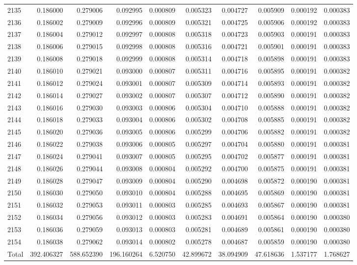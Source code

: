 \begin{tabular}{lrrrrrrrrr}
2135 & 0.186000 & 0.279006 & 0.092995 & 0.000809 & 0.005323 & 0.004727 & 0.005909 & 0.000192 & 0.000383 \\
2136 & 0.186002 & 0.279009 & 0.092996 & 0.000809 & 0.005321 & 0.004725 & 0.005906 & 0.000192 & 0.000383 \\
2137 & 0.186004 & 0.279012 & 0.092997 & 0.000808 & 0.005318 & 0.004723 & 0.005903 & 0.000191 & 0.000383 \\
2138 & 0.186006 & 0.279015 & 0.092998 & 0.000808 & 0.005316 & 0.004721 & 0.005901 & 0.000191 & 0.000383 \\
2139 & 0.186008 & 0.279018 & 0.092999 & 0.000808 & 0.005314 & 0.004718 & 0.005898 & 0.000191 & 0.000383 \\
2140 & 0.186010 & 0.279021 & 0.093000 & 0.000807 & 0.005311 & 0.004716 & 0.005895 & 0.000191 & 0.000382 \\
2141 & 0.186012 & 0.279024 & 0.093001 & 0.000807 & 0.005309 & 0.004714 & 0.005893 & 0.000191 & 0.000382 \\
2142 & 0.186014 & 0.279027 & 0.093002 & 0.000807 & 0.005307 & 0.004712 & 0.005890 & 0.000191 & 0.000382 \\
2143 & 0.186016 & 0.279030 & 0.093003 & 0.000806 & 0.005304 & 0.004710 & 0.005888 & 0.000191 & 0.000382 \\
2144 & 0.186018 & 0.279033 & 0.093004 & 0.000806 & 0.005302 & 0.004708 & 0.005885 & 0.000191 & 0.000382 \\
2145 & 0.186020 & 0.279036 & 0.093005 & 0.000806 & 0.005299 & 0.004706 & 0.005882 & 0.000191 & 0.000382 \\
2146 & 0.186022 & 0.279038 & 0.093006 & 0.000805 & 0.005297 & 0.004704 & 0.005880 & 0.000191 & 0.000381 \\
2147 & 0.186024 & 0.279041 & 0.093007 & 0.000805 & 0.005295 & 0.004702 & 0.005877 & 0.000191 & 0.000381 \\
2148 & 0.186026 & 0.279044 & 0.093008 & 0.000804 & 0.005292 & 0.004700 & 0.005875 & 0.000191 & 0.000381 \\
2149 & 0.186028 & 0.279047 & 0.093009 & 0.000804 & 0.005290 & 0.004698 & 0.005872 & 0.000190 & 0.000381 \\
2150 & 0.186030 & 0.279050 & 0.093010 & 0.000804 & 0.005288 & 0.004695 & 0.005869 & 0.000190 & 0.000381 \\
2151 & 0.186032 & 0.279053 & 0.093011 & 0.000803 & 0.005285 & 0.004693 & 0.005867 & 0.000190 & 0.000381 \\
2152 & 0.186034 & 0.279056 & 0.093012 & 0.000803 & 0.005283 & 0.004691 & 0.005864 & 0.000190 & 0.000380 \\
2153 & 0.186036 & 0.279059 & 0.093013 & 0.000803 & 0.005281 & 0.004689 & 0.005861 & 0.000190 & 0.000380 \\
2154 & 0.186038 & 0.279062 & 0.093014 & 0.000802 & 0.005278 & 0.004687 & 0.005859 & 0.000190 & 0.000380 \\
Total & 392.406327 & 588.652390 & 196.160264 & 6.520750 & 42.899672 & 38.094909 & 47.618636 & 1.537177 & 1.768627 \\
\bottomrule
\end{tabular}
